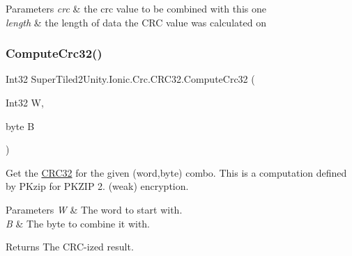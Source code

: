 \begin{DoxyParams}{Parameters}
{\em crc} & the crc value to be combined with this one\\
\hline
{\em length} & the length of data the C\+RC value was calculated on\\
\hline
\end{DoxyParams}
\mbox{\label{class_super_tiled2_unity_1_1_ionic_1_1_crc_1_1_c_r_c32_abc80dde14bd2132eb4ebcbd88b8f9aaf}} 
\subsubsection{\texorpdfstring{Compute\+Crc32()}{ComputeCrc32()}}
{\footnotesize\ttfamily Int32 Super\+Tiled2\+Unity.\+Ionic.\+Crc.\+C\+R\+C32.\+Compute\+Crc32 (\begin{DoxyParamCaption}\item[{Int32}]{W,  }\item[{byte}]{B }\end{DoxyParamCaption})}



Get the \mbox{\hyperlink{class_super_tiled2_unity_1_1_ionic_1_1_crc_1_1_c_r_c32}{C\+R\+C32}} for the given (word,byte) combo. This is a computation defined by P\+Kzip for P\+K\+Z\+IP 2. (weak) encryption. 


\begin{DoxyParams}{Parameters}
{\em W} & The word to start with.\\
\hline
{\em B} & The byte to combine it with.\\
\hline
\end{DoxyParams}
\begin{DoxyReturn}{Returns}
The C\+R\+C-\/ized result.
\end{DoxyReturn}
\mbox{\label{class_super_tiled2_unity_1_1_ionic_1_1_crc_1_1_c_r_c32_a15be255989390633f0344f817b124911}} 
